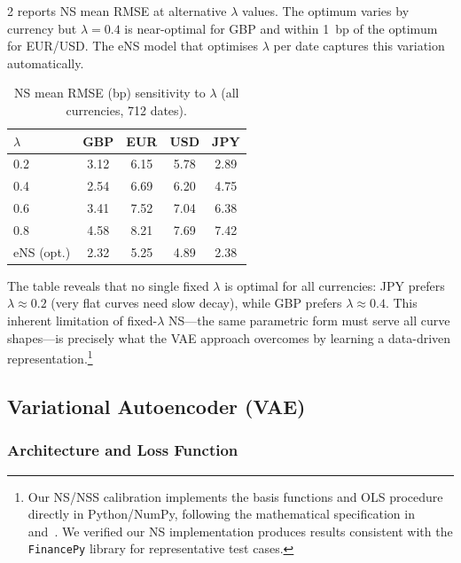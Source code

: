 \documentclass[10pt,a4paper]{article}
\theoremstyle{plain}
\theoremstyle{definition}
\begin{document}
\begin{multicols}{2}
 reports NS mean RMSE at alternative $\lambda$ values. The optimum varies by currency but $\lambda = 0.4$ is near-optimal for GBP and within 1~bp of the optimum for EUR/USD. The eNS model that optimises $\lambda$ per date captures this variation automatically.

\begin{table}[H]
\centering
\caption{NS mean RMSE (bp) sensitivity to $\lambda$ (all currencies, 712 dates).}\label{tab:lambda_sens}
\begin{tabular}{lcccc}
\toprule
$\lambda$ & GBP & EUR & USD & JPY \\
\midrule
0.2 & 3.12 & 6.15 & 5.78 & 2.89 \\
0.4 & 2.54 & 6.69 & 6.20 & 4.75 \\
0.6 & 3.41 & 7.52 & 7.04 & 6.38 \\
0.8 & 4.58 & 8.21 & 7.69 & 7.42 \\
\midrule
eNS (opt.) & 2.32 & 5.25 & 4.89 & 2.38 \\
\bottomrule
\end{tabular}
\end{table}

\noindent The table reveals that no single fixed $\lambda$ is optimal for all currencies: JPY prefers $\lambda \approx 0.2$ (very flat curves need slow decay), while GBP prefers $\lambda \approx 0.4$. This inherent limitation of fixed-$\lambda$ NS---the same parametric form must serve all curve shapes---is precisely what the VAE approach overcomes by learning a data-driven representation.\footnote{Our NS/NSS calibration implements the basis functions and OLS procedure directly in Python/NumPy, following the mathematical specification in~\cite{nelson1987} and~\cite{svensson1995}. We verified our NS implementation produces results consistent with the \texttt{FinancePy} library for representative test cases.}

\subsection{Variational Autoencoder (VAE)}

\subsubsection{Architecture and Loss Function}


\end{multicols}
\end{document}
